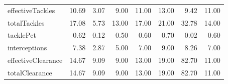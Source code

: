 \begin{table}[H]
\begin{tabular}{lrrrrrrr}
effectiveTackles & 10.69 & 3.07 & 9.00 & 11.00 & 13.00 & 9.42 & 11.00 \\
totalTackles & 17.08 & 5.73 & 13.00 & 17.00 & 21.00 & 32.78 & 14.00 \\
tacklePct & 0.62 & 0.12 & 0.50 & 0.60 & 0.70 & 0.02 & 0.60 \\
interceptions & 7.38 & 2.87 & 5.00 & 7.00 & 9.00 & 8.26 & 7.00 \\
effectiveClearance & 14.67 & 9.09 & 9.00 & 13.00 & 19.00 & 82.70 & 11.00 \\
totalClearance & 14.67 & 9.09 & 9.00 & 13.00 & 19.00 & 82.70 & 11.00 \\
\hline
\end{tabular}
\end{table}

